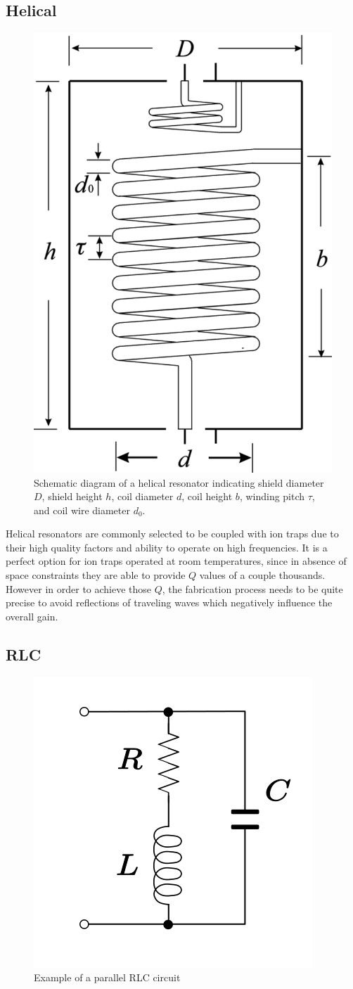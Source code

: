 \subsection{Helical}
\begin{figure}[h]
	\centering
	\includegraphics[width=.6\textwidth]{images/helical}
	\caption{Schematic diagram of a helical resonator indicating shield diameter $D$, shield height $h$, coil diameter $d$, coil height $b$, winding pitch $\tau$, and coil wire diameter $d_0$. \cite{Deng2014}}
	\label{fig:helical_example}
\end{figure}

Helical resonators are commonly selected to be coupled with ion traps due to their high quality factors and ability to operate on high frequencies. It is a perfect option for ion traps operated at room temperatures, since in absence of space constraints they are able to provide $Q$ values of a couple thousands. However in order to achieve those $Q$, the fabrication process needs to be quite precise to avoid reflections of traveling waves which negatively influence the overall gain.
\subsection{RLC}
\begin{figure}[h]
	\centering
	\includegraphics[width=.5\textwidth]{images/RLC}
	\caption{Example of a parallel RLC circuit}
\end{figure}

